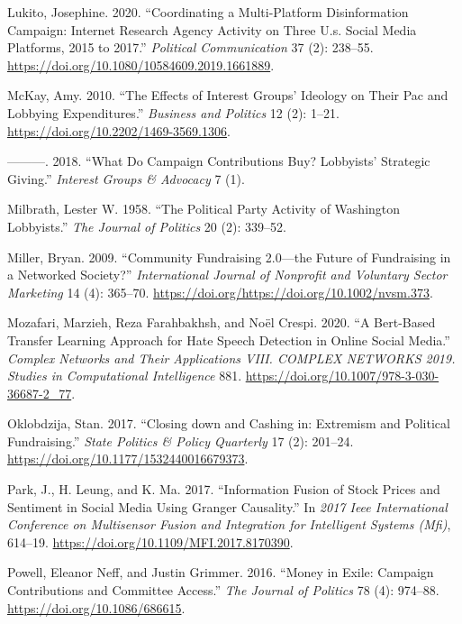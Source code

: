 \documentclass[12pt,]{article}
\begin{document}
\leavevmode\hypertarget{ref-lukito2020}{}%
Lukito, Josephine. 2020. ``Coordinating a Multi-Platform Disinformation
Campaign: Internet Research Agency Activity on Three U.s. Social Media
Platforms, 2015 to 2017.'' \emph{Political Communication} 37 (2):
238--55. \url{https://doi.org/10.1080/10584609.2019.1661889}.

\leavevmode\hypertarget{ref-mckay2010}{}%
McKay, Amy. 2010. ``The Effects of Interest Groups' Ideology on Their
Pac and Lobbying Expenditures.'' \emph{Business and Politics} 12 (2):
1--21. \url{https://doi.org/10.2202/1469-3569.1306}.

\leavevmode\hypertarget{ref-mckay2018}{}%
---------. 2018. ``What Do Campaign Contributions Buy? Lobbyists'
Strategic Giving.'' \emph{Interest Groups \& Advocacy} 7 (1).

\leavevmode\hypertarget{ref-milbrath1958}{}%
Milbrath, Lester W. 1958. ``The Political Party Activity of Washington
Lobbyists.'' \emph{The Journal of Politics} 20 (2): 339--52.

\leavevmode\hypertarget{ref-miller2009}{}%
Miller, Bryan. 2009. ``Community Fundraising 2.0---the Future of
Fundraising in a Networked Society?'' \emph{International Journal of
Nonprofit and Voluntary Sector Marketing} 14 (4): 365--70.
\url{https://doi.org/https://doi.org/10.1002/nvsm.373}.

\leavevmode\hypertarget{ref-mozafari2020}{}%
Mozafari, Marzieh, Reza Farahbakhsh, and Noël Crespi. 2020. ``A
Bert-Based Transfer Learning Approach for Hate Speech Detection in
Online Social Media.'' \emph{Complex Networks and Their Applications
VIII. COMPLEX NETWORKS 2019. Studies in Computational Intelligence} 881.
\url{https://doi.org/10.1007/978-3-030-36687-2_77}.

\leavevmode\hypertarget{ref-oklobdzija2017}{}%
Oklobdzija, Stan. 2017. ``Closing down and Cashing in: Extremism and
Political Fundraising.'' \emph{State Politics \& Policy Quarterly} 17
(2): 201--24. \url{https://doi.org/10.1177/1532440016679373}.

\leavevmode\hypertarget{ref-park2017}{}%
Park, J., H. Leung, and K. Ma. 2017. ``Information Fusion of Stock
Prices and Sentiment in Social Media Using Granger Causality.'' In
\emph{2017 Ieee International Conference on Multisensor Fusion and
Integration for Intelligent Systems (Mfi)}, 614--19.
\url{https://doi.org/10.1109/MFI.2017.8170390}.

\leavevmode\hypertarget{ref-powell2016}{}%
Powell, Eleanor Neff, and Justin Grimmer. 2016. ``Money in Exile:
Campaign Contributions and Committee Access.'' \emph{The Journal of
Politics} 78 (4): 974--88. \url{https://doi.org/10.1086/686615}.
\end{document}
